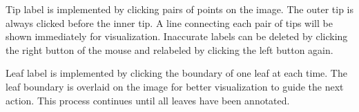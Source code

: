 Tip label is implemented by clicking pairs of points on the image.
The outer tip is always clicked before the inner tip.
A line connecting each pair of tips will be shown immediately for visualization.
Inaccurate labels can be deleted by clicking the right button of the mouse and relabeled by clicking the left button again.

Leaf label is implemented by clicking the boundary of one leaf at each time. 
The leaf boundary is overlaid on the image for better visualization to guide the next action.
This process continues until all leaves have been annotated.



%















